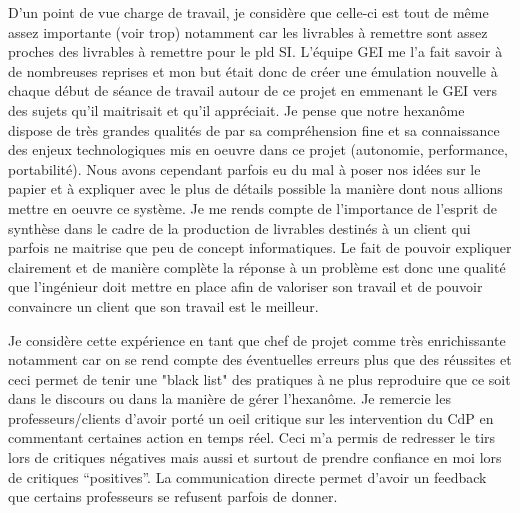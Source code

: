 D'un point de vue charge de travail, je considère que celle-ci est tout de même assez importante (voir trop) notamment car les livrables à remettre sont assez proches des livrables à remettre pour le pld SI. L'équipe GEI me l'a fait savoir à de nombreuses reprises et mon but était donc de créer une émulation nouvelle à chaque début de séance de travail autour de ce projet en emmenant le GEI vers des sujets qu'il maitrisait et qu'il appréciait. Je pense que notre hexanôme dispose de très grandes qualités de par sa compréhension fine et sa connaissance des enjeux technologiques mis en oeuvre dans ce projet (autonomie, performance, portabilité). Nous avons cependant parfois eu du mal à poser nos idées sur le papier et à expliquer avec le plus de détails possible la manière dont nous allions mettre en oeuvre ce système. Je me rends compte de l'importance de l'esprit de synthèse dans le cadre de la production de livrables destinés à un client qui parfois ne maitrise que peu de concept informatiques. Le fait de pouvoir expliquer clairement et de manière complète la réponse à un problème est donc une qualité que l'ingénieur doit mettre en place afin de valoriser son travail et de pouvoir convaincre un client que son travail est le meilleur.

Je considère cette expérience en tant que chef de projet comme très enrichissante notamment car on se rend compte des éventuelles erreurs plus que des réussites et ceci permet de tenir une "black list" des pratiques à ne plus reproduire que ce soit dans le discours ou dans la manière de gérer l'hexanôme.
Je remercie les professeurs/clients d'avoir porté un oeil critique sur les intervention du CdP en commentant certaines action en temps réel. Ceci m'a permis de redresser le tirs lors de critiques \og négatives \fg mais aussi et surtout de prendre confiance en moi lors de critiques ``positives''. La communication directe permet d'avoir un feedback que certains professeurs se refusent parfois de donner.